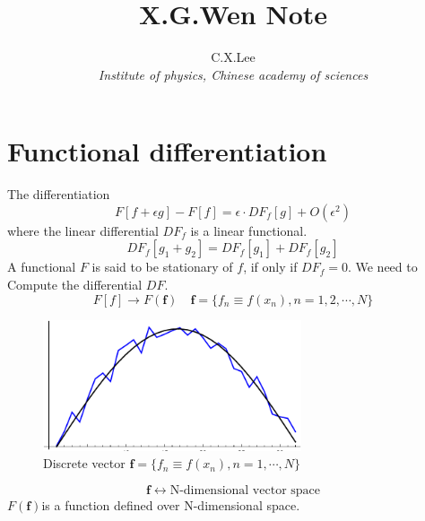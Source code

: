 \documentclass[a4paper,11pt]{article}
\begin{document}
\title{X.G.Wen Note}
\author{C.X.Lee\\\textit{Institute of physics, Chinese academy of sciences}}
\maketitle
\section{Functional differentiation}
The differentiation
\begin{equation*}
  F[f+\epsilon g]-F[f]=\epsilon\cdot DF_f[g]+O(\epsilon^2)
\end{equation*}
where the linear differential $DF_f$ is a linear functional.
\begin{equation*}
  DF_f[g_1+g_2]=DF_f[g_1]+DF_f[g_2]
\end{equation*}
A functional $F$ is said to be stationary of $f$, if only if $DF_f=0$. We need to Compute the differential $DF$.
\begin{equation*}
  F[f]\longrightarrow F(\mathbf{f})\quad\mathbf{f}=\{f_n\equiv f(x_n),n=1,2,\cdots,N\}
\end{equation*}
\begin{figure}[H]
  \centering
  \includegraphics[width=3in]{1.pdf}
  \caption{Discrete vector $\mathbf{f}=\{f_n\equiv f(x_n),n=1,\cdots,N\}$}\label{fig1}
\end{figure}
\begin{equation*}
  \mathbf{f}\longleftrightarrow \text{N-dimensional vector space}
\end{equation*}
$F(\mathbf{f})$is a function defined over N-dimensional space.
\end{document}
